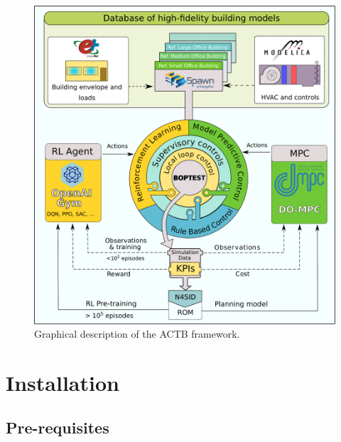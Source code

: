 \documentclass{article}
\begin{document}
\begin{figure}
    \centering

    \includegraphics[width=400pt]{Figures/ACTB_v4.pdf}
    \caption{Graphical description of the ACTB framework.}
    \label{fig:actb-framework}
\end{figure}

\section{Installation}\label{s:install}

\subsection{Pre-requisites}\label{s:prereq}
\end{document}
